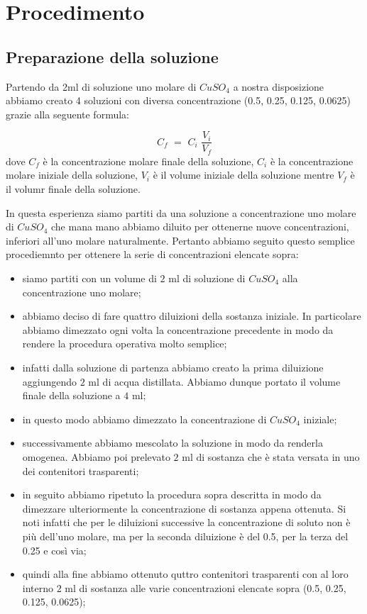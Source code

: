 
\section{Procedimento}

\subsection{Preparazione della soluzione}

Partendo da 2ml di soluzione uno molare di $CuSO_4$ a nostra disposizione abbiamo creato 4 soluzioni con diversa concentrazione (0.5, 0.25, 0.125, 0.0625) grazie alla seguente formula:

\begin{equation}
	C_f \,\, = \,\, C_i \,\, \frac{V_i}{V_f}
	\label{eq:proporzione}
\end{equation}
%
dove $C_f$ è la concentrazione molare finale della soluzione, $C_i$ è la concentrazione molare iniziale della soluzione, $V_i$ è il volume iniziale della soluzione mentre $V_f$ è il volumr finale della soluzione.

In questa esperienza siamo partiti da una soluzione a concentrazione uno molare di $CuSO_4$ che mana mano abbiamo diluito per ottenerne nuove concentrazioni, inferiori all'uno molare naturalmente.
Pertanto abbiamo seguito questo semplice procediemnto per ottenere la serie di concentrazioni elencate sopra:

\begin{itemize}
	\item{siamo partiti con un volume di $2\,\,\si{\milli\litre}$ di soluzione di $CuSO_4$ alla concentrazione uno molare;}
	\item{abbiamo deciso di fare quattro diluizioni della sostanza iniziale. In particolare abbiamo dimezzato ogni volta la concentrazione precedente in modo da rendere la procedura operativa molto semplice;}
	\item{infatti dalla soluzione di partenza abbiamo creato la prima diluizione aggiungendo $2\,\,\si{\milli\litre}$ di acqua distillata. Abbiamo dunque portato il volume finale della soluzione a $4\,\,\si{\milli\litre}$;}
	\item{in questo modo abbiamo dimezzato la concentrazione di $CuSO_4$ iniziale;}
	\item{successivamente abbiamo mescolato la soluzione in modo da renderla omogenea. Abbiamo poi prelevato $2\,\,\si{\milli\litre}$ di sostanza che è stata versata in uno dei contenitori trasparenti;}
	\item{in seguito abbiamo ripetuto la procedura sopra descritta in modo da dimezzare ulteriormente la concentrazione di sostanza appena ottenuta. Si noti infatti che per le diluizioni successive la concentrazione di soluto non è più dell'uno molare, ma per la seconda diluizione è del 0.5, per la terza del 0.25 e così via;}
	\item{quindi alla fine abbiamo ottenuto quttro contenitori trasparenti con al loro interno $2\,\,\si{\milli\litre}$ di sostanza alle varie concentrazioni elencate sopra (0.5, 0.25, 0.125, 0.0625);}
\end{itemize}

